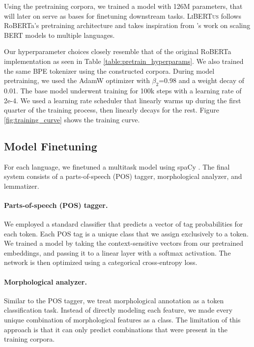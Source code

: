 \documentclass[11pt]{article}
\newcommand{\libertus}{\textsc{LiBERTus}}
\begin{document}
Using the pretraining corpora, we trained a model with 126M parameters, that will later on serve as bases for finetuning downstream tasks.
\libertus{} follows RoBERTa's pretraining architecture \cite{liu-etal-2019-roberta} and takes inspiration from \citet{conneau-etal-2020-unsupervised}'s work on scaling BERT models to multiple languages.



Our hyperparameter choices closely resemble that of the original RoBERTa implementation as seen in Table \ref{table:pretrain_hyperparams}.
We also trained the same BPE tokenizer \citep{sennrich-etal-2016-neural} using the constructed corpora.
During model pretraining, we used the AdamW optimizer with $\beta_2$=0.98 and a weight decay of 0.01.
The base model underwent training for 100k steps with a learning rate of 2e-4.
We used a learning rate scheduler that linearly warms up during the first quarter of the training process, then linearly decays for the rest.
Figure \ref{fig:training_curve} shows the training curve.

\subsection{Model Finetuning}

For each language, we finetuned a multitask model using spaCy \cite{honnibal-etal-2020-spacy}. 
The final system consists of a parts-of-speech (POS) tagger, morphological analyzer, and lemmatizer.

\paragraph{Parts-of-speech (POS) tagger.}
We employed a standard classifier that predicts a vector of tag probabilities for each token.
Each POS tag is a unique class that we assign exclusively to a token.
We trained a model by taking the context-sensitive vectors from our pretrained embeddings, and passing it to a linear layer with a softmax activation.
The network is then optimized using a categorical cross-entropy loss.

\paragraph{Morphological analyzer.}
Similar to the POS tagger, we treat morphological annotation as a token classification task.
Instead of directly modeling each feature, we made every unique combination of morphological features as a class.
The limitation of this approach is that it can only predict combinations that were present in the training corpora.
\end{document}
